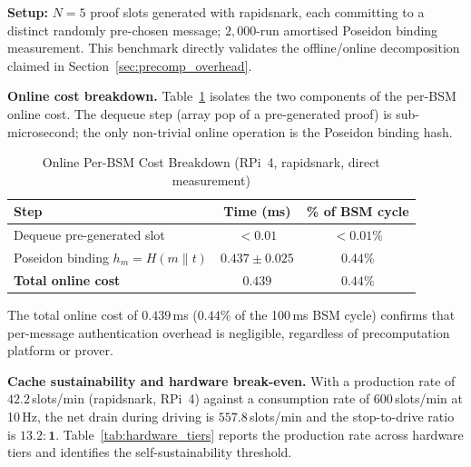 \textbf{Setup:} $N=5$ proof slots generated with rapidsnark, each committing to a
distinct randomly pre-chosen message; $2{,}000$-run amortised Poseidon binding
measurement. This benchmark directly validates the offline/online decomposition
claimed in Section~\ref{sec:precomp_overhead}.

\textbf{Online cost breakdown.}
Table~\ref{tab:online_cost} isolates the two components of the per-BSM online cost.
The dequeue step (array pop of a pre-generated proof) is sub-microsecond; the only
non-trivial online operation is the Poseidon binding hash.

\begin{table}[t]
\centering
\caption{Online Per-BSM Cost Breakdown (RPi~4, rapidsnark, direct measurement)}
\label{tab:online_cost}
\begin{tabular}{@{}lcc@{}}
\toprule
\textbf{Step} & \textbf{Time (ms)} & \textbf{\% of BSM cycle} \\
\midrule
Dequeue pre-generated slot       & $< 0.01$            & $< 0.01\%$ \\
Poseidon binding $h_m = H(m \| t)$ & $0.437 \pm 0.025$ & $0.44\%$   \\
\midrule
\textbf{Total online cost}       & $\mathbf{0.439}$    & $\mathbf{0.44\%}$ \\
\bottomrule
\end{tabular}
\end{table}

The total online cost of $\mathbf{0.439}$\,ms ($0.44\%$ of the 100\,ms BSM cycle)
confirms that per-message authentication overhead is negligible, regardless of
precomputation platform or prover.

\textbf{Cache sustainability and hardware break-even.}
With a production rate of $42.2$\,slots/min (rapidsnark, RPi~4) against a consumption
rate of $600$\,slots/min at 10\,Hz, the net drain during driving is
$557.8$\,slots/min and the stop-to-drive ratio is $\mathbf{13.2:1}$.
Table~\ref{tab:hardware_tiers} reports the production rate across hardware tiers
and identifies the self-sustainability threshold.

